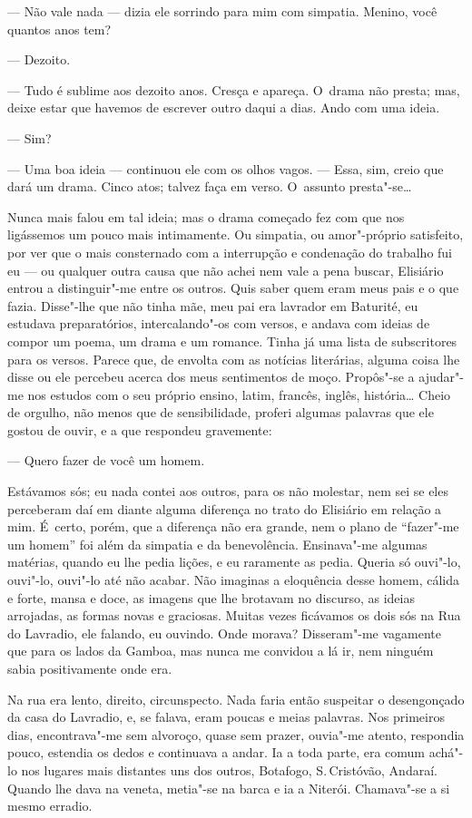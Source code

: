 \begin{linenumbers}
--- Não vale nada --- dizia ele sorrindo para mim com simpatia. Menino,
você quantos anos tem?

--- Dezoito.

--- Tudo é sublime aos dezoito anos. Cresça e apareça. O~drama não
presta; mas, deixe estar que havemos de escrever outro daqui a dias.
Ando com uma ideia.

--- Sim?

--- Uma boa ideia --- continuou ele com os olhos vagos. --- Essa, sim,
creio que dará um drama. Cinco atos; talvez faça em verso. O~assunto
presta"-se\ldots{}

Nunca mais falou em tal ideia; mas o drama começado fez com que nos
ligássemos um pouco mais intimamente. Ou simpatia, ou amor"-próprio
satisfeito, por ver que o mais consternado com a interrupção e
condenação do trabalho fui eu --- ou qualquer outra causa que não achei
nem vale a pena buscar, Elisiário entrou a distinguir"-me entre os
outros. Quis saber quem eram meus pais e o que fazia. Disse"-lhe que não
tinha mãe, meu pai era lavrador em Baturité, eu estudava preparatórios,
intercalando"-os com versos, e andava com ideias de compor um poema, um
drama e um romance. Tinha já uma lista de subscritores para os versos.
Parece que, de envolta com as notícias literárias, alguma coisa lhe
disse ou ele percebeu acerca dos meus sentimentos de moço. Propôs"-se a
ajudar"-me nos estudos com o seu próprio ensino, latim, francês, inglês,
história\ldots{} Cheio de orgulho, não menos que de sensibilidade, proferi
algumas palavras que ele gostou de ouvir, e a que respondeu gravemente:

--- Quero fazer de você um homem.

Estávamos sós; eu nada contei aos outros, para os não molestar, nem sei
se eles perceberam daí em diante alguma diferença no trato do Elisiário
em relação a mim. É~certo, porém, que a diferença não era grande, nem o
plano de ``fazer"-me um homem'' foi além da simpatia e da benevolência.
Ensinava"-me algumas matérias, quando eu lhe pedia lições, e eu raramente
as pedia. Queria só ouvi"-lo, ouvi"-lo, ouvi"-lo até não acabar. Não
imaginas a eloquência desse homem, cálida e forte, mansa e doce, as
imagens que lhe brotavam no discurso, as ideias arrojadas, as formas
novas e graciosas. Muitas vezes ficávamos os dois sós na Rua do
Lavradio, ele falando, eu ouvindo. Onde morava? Disseram"-me vagamente
que para os lados da Gamboa, mas nunca me convidou a lá ir, nem ninguém
sabia positivamente onde era.

Na rua era lento, direito, circunspecto. Nada faria então suspeitar o
desengonçado da casa do Lavradio, e, se falava, eram poucas e meias
palavras. Nos primeiros dias, encontrava"-me sem alvoroço, quase sem
prazer, ouvia"-me atento, respondia pouco, estendia os dedos e continuava
a andar. Ia a toda parte, era comum achá"-lo nos lugares mais distantes
uns dos outros, Botafogo, S.\,Cristóvão, Andaraí. Quando lhe dava na
veneta, metia"-se na barca e ia a Niterói. Chamava"-se a si mesmo erradio.


\end{linenumbers}
